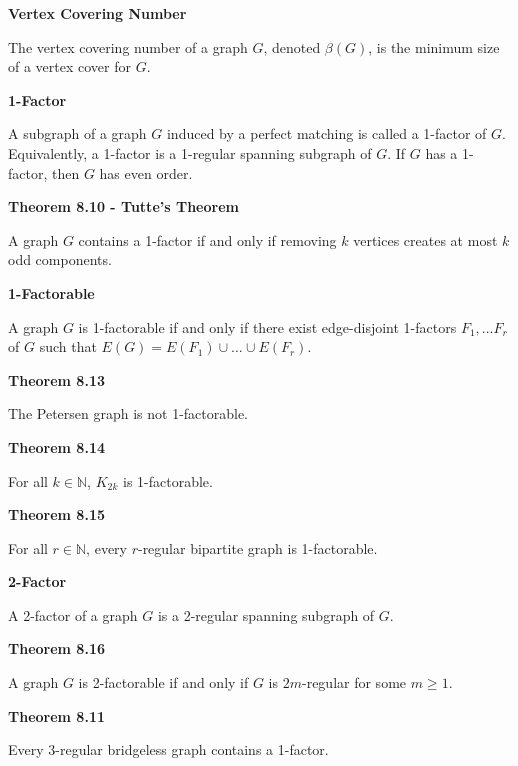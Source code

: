 \documentclass{article}
\begin{document}
\medskip\noindent\textbf{Vertex Covering Number}

	The vertex covering number of a graph $G$, denoted $\beta(G)$, is the minimum size of a vertex cover for $G$.

\medskip\noindent\textbf{1-Factor}

	A subgraph of a graph $G$ induced by a perfect matching is called a 1-factor of $G$.
	Equivalently, a 1-factor is a 1-regular spanning subgraph of $G$.
	If $G$ has a 1-factor, then $G$ has even order.

\medskip\noindent\textbf{Theorem 8.10 - Tutte's Theorem}

	A graph $G$ contains a 1-factor if and only if removing $k$ vertices creates at most $k$ odd components.

\medskip\noindent\textbf{1-Factorable}

    A graph $G$ is 1-factorable if and only if there exist edge-disjoint 1-factors $F_1, \hdots F_r$ of $G$ such that $E(G) = E(F_1) \cup \hdots \cup E(F_r)$.

\medskip\noindent\textbf{Theorem 8.13}

    The Petersen graph is not 1-factorable.

\medskip\noindent\textbf{Theorem 8.14}

    For all $k \in \mathbb N$, $K_{2k}$ is 1-factorable.

\medskip\noindent\textbf{Theorem 8.15}
    
    For all $r \in \mathbb N$, every $r$-regular bipartite graph is 1-factorable.

\medskip\noindent\textbf{2-Factor}

    A 2-factor of a graph $G$ is a 2-regular spanning subgraph of $G$.

\medskip\noindent\textbf{Theorem 8.16}

    A graph $G$ is 2-factorable if and only if $G$ is $2m$-regular for some $m \geq 1$.

\medskip\noindent\textbf{Theorem 8.11}

	Every 3-regular bridgeless graph contains a 1-factor.
\end{document}
